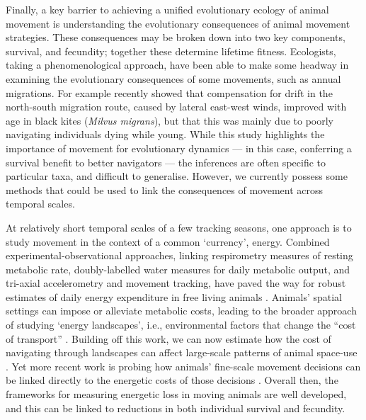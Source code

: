 Finally, a key barrier to achieving a unified evolutionary ecology of animal movement is understanding the evolutionary consequences of animal movement strategies.
These consequences may be broken down into two key components, survival, and fecundity; together these determine lifetime fitness.
Ecologists, taking a phenomenological approach, have been able to make some headway in examining the evolutionary consequences of some movements, such as annual migrations.
For example \textcite{sergio2022} recently showed that compensation for drift in the north-south migration route, caused by lateral east-west winds, improved with age in black kites (\emph{Milvus migrans}), but that this was mainly due to poorly navigating individuals dying while young.
While this study highlights the importance of movement for evolutionary dynamics --- in this case, conferring a survival benefit to better navigators --- the inferences are often specific to particular taxa, and difficult to generalise.
However, we currently possess some methods that could be used to link the consequences of movement across temporal scales.

At relatively short temporal scales of a few tracking seasons, one approach is to study movement in the context of a common `currency', energy.
Combined experimental-observational approaches, linking respirometry measures of resting metabolic rate, doubly-labelled water measures for daily metabolic output, and tri-axial accelerometry and movement tracking, have paved the way for robust estimates of daily energy expenditure in free living animals \parencite{stothart2016}.
Animals' spatial settings can impose or alleviate metabolic costs, leading to the broader approach of studying `energy landscapes', i.e., environmental factors that change the ``cost of transport'' \parencite{shepard2013}.
Building off this work, we can now estimate how the cost of navigating through landscapes can affect large-scale patterns of animal space-use \parencite[e.g.][]{gallagher2017}.
Yet more recent work is probing how animals' fine-scale movement decisions can be linked directly to the energetic costs of those decisions \parencite{klappstein2022}.
Overall then, the frameworks for measuring energetic loss in moving animals are well developed, and this can be linked to reductions in both individual survival and fecundity.

